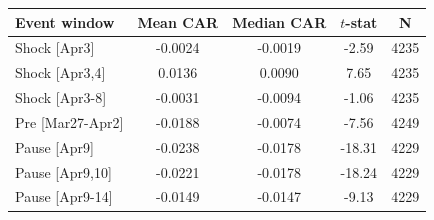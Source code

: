 \begin{tabular}{lcccc}
\toprule
Event window & Mean CAR & Median CAR & $t$-stat & N \\
\midrule
{Shock [Apr3]} & -0.0024 & -0.0019 & -2.59 & 4235 \\
{Shock [Apr3,4]} & 0.0136 & 0.0090 & 7.65 & 4235 \\
{Shock [Apr3-8]} & -0.0031 & -0.0094 & -1.06 & 4235 \\
{Pre [Mar27-Apr2]} & -0.0188 & -0.0074 & -7.56 & 4249 \\
{Pause [Apr9]} & -0.0238 & -0.0178 & -18.31 & 4229 \\
{Pause [Apr9,10]} & -0.0221 & -0.0178 & -18.24 & 4229 \\
{Pause [Apr9-14]} & -0.0149 & -0.0147 & -9.13 & 4229 \\
\bottomrule
\end{tabular}